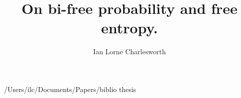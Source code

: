 \documentclass [PhD] {uclathes}
\title          {On bi-free probability and free entropy.}
\author         {Ian Lorne Charlesworth}
\begin{document}
\makeintropages









 {/Users/ilc/Documents/Papers/biblio}
 {thesis}
\end{document}
